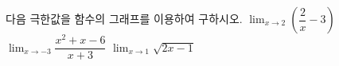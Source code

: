 다음 극한값을 함수의 그래프를 이용하여 구하시오.
 $\displaystyle\lim_{x\to 2}\left(\dfrac{2}{x}-3\right)$
 $\displaystyle\lim_{x\to -3}\dfrac{x^2+x-6}{x+3}$
 $\displaystyle\lim_{x\to 1}\sqrt{2x-1}$
